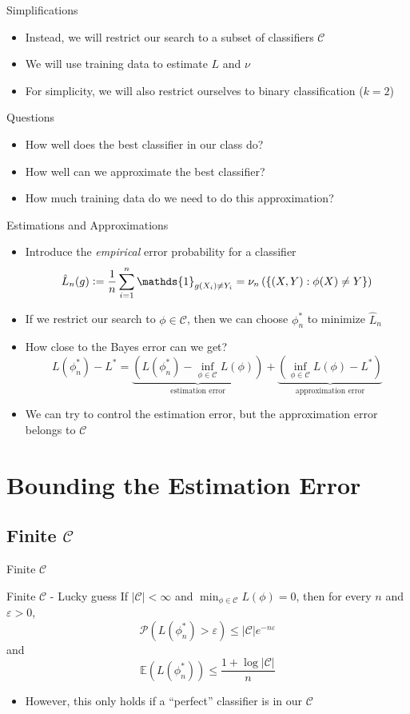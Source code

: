\documentclass{beamer}
\renewcommand{\Pr}[1]{\mathcal{P} \left( #1 \right)}
\newcommand{\cls}{\mathcal{C}}
\newcommand{\E}[1]{\mathbb{E}\left( #1 \right)}
\newcommand{\defeq}{\vcentcolon=}
\newcommand{\pa}[1]{\left( #1 \right)}
\newcommand{\abs}[1]{\left| #1 \right|}
\newcommand{\br}[1]{\left\{ #1 \right\} }
\newcommand{\eps}{\varepsilon}
\begin{document}
\begin{frame}{Simplifications}
\begin{itemize}
\item Instead, we will restrict our search to a subset of classifiers $\cls$
\item We will use training data to estimate $L$ and $\nu$
\item For simplicity, we will also restrict ourselves to binary classification ($k=2$)
\end{itemize}
\end{frame}

\begin{frame}{Questions}
\begin{itemize}
\item How well does the best classifier in our class do?
\item How well can we approximate the best classifier?
\item How much training data do we need to do this approximation?
\end{itemize}
\end{frame}

\begin{frame}{Estimations and Approximations}
\begin{itemize}
\item Introduce the \emph{empirical} error probability for a classifier
\[ \hat{L}_n(g) \defeq \frac1n \sum_{i=1}^n \mathds{1}_{g(X_i) \ne Y_i} = \nu_n\pa{\br{(X,Y) : \phi(X) \ne Y}}\]
\item If we restrict our search to $\phi \in \cls$, then we can choose $\phi_n^*$ to minimize $\hat{L}_n$
\item How close to the Bayes error can we get?
\[ L(\phi_n^*) - L^* = \underbrace{\pa{ L(\phi_n^*) - \inf_{\phi \in \cls} L(\phi)}}_{\text{estimation error}} + \underbrace{\pa{ \inf_{\phi \in \cls} L(\phi) - L^*}}_{\text{approximation error}} \]
\item We can try to control the estimation error, but the approximation error belongs to $\cls$
\end{itemize}
\end{frame}

\section{Bounding the Estimation Error}
\subsection{Finite $\cls$}
\begin{frame}{Finite $\cls$}
\begin{block}{Finite $\cls$ - Lucky guess}
If $\abs{\cls} < \infty$ and $\min_{\phi \in \cls} L(\phi) = 0$, then for every $n$ and $\eps > 0$,
\[ \Pr{L(\phi^*_n) > \eps} \leq \abs{\cls} e^{-n\eps}\]
and
\[ \E{L(\phi^*_n)} \leq \frac{1 + \log\abs{\cls}}n \]
\end{block}
\begin{itemize}
\item However, this only holds if a ``perfect'' classifier is in our $\cls$
\end{itemize}
\end{frame}
\end{document}
